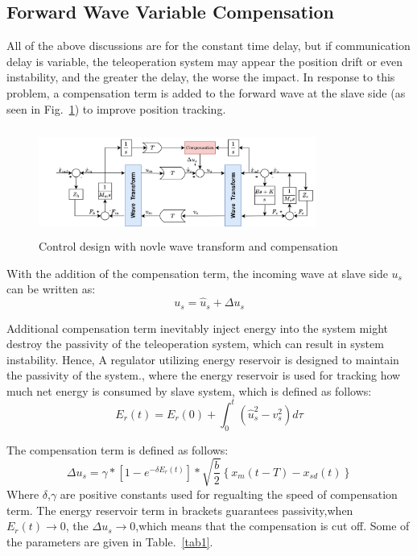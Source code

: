 \subsection{Forward Wave Variable Compensation}
All of the above discussions are for the constant time delay,
but if communication delay is variable,
the teleoperation system may appear the position drift or even instability,
and the greater the delay, the worse the impact. In response to this problem,
a compensation term is added to the forward wave at the slave side  (as seen in Fig.~\ref{fig6})
to improve position tracking\cite{b16}.
\begin{figure}[htbp]
    \centerline{\includegraphics[height=3.5cm,width=9.1cm]{with compensation.jpg}}
    \caption{Control design with novle wave transform and compensation}
    \label{fig6}
\end{figure}
\par With the addition of the compensation term,
the incoming wave at slave side $u_s$ can be written as:
\begin{equation}
    {{u}_{s}}={{\hat{u}}_{s}}+\Delta {{u}_{s}}\label{eq18}
\end{equation}
\par Additional compensation term inevitably inject energy into the system
might destroy the passivity of the teleoperation system,
which can result in system instability.
Hence, A regulator utilizing energy reservoir
is designed to maintain the passivity of the system.,
where the energy reservoir is used for tracking 
how much net energy is consumed by slave system,
which is defined as follows:
\begin{equation}
    {{E}_{r}}(t)={{E}_{r}}(0)+\int_{0}^{t}{(\hat{u}_{s}^{2}-v_{s}^{2})}d\tau\label{eq19}
\end{equation}
\par The compensation term is defined as follows:
\begin{equation}
    \Delta {{u}_{s}}=\gamma*\left[ 1-{{e}^{-\delta {{E}_{r}}(t)}}
    \right]*\sqrt{\frac{b}{2}}\left\{ {{x}_{m}}(t-T)-{{x}_{sd}}(t) \right\}\label{eq20}
\end{equation}
Where $\delta$,$\gamma$ are positive constants used for regualting the speed of compensation term.
The energy reservoir term in brackets guarantees passivity,when $E_r(t) \rightarrow 0$,
the $\Delta u_s \rightarrow 0$,which means that the compensation is cut off.
Some of the parameters are given in Table.~\ref{tab1}.

